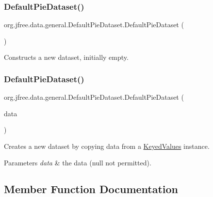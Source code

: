 \subsubsection{\texorpdfstring{Default\+Pie\+Dataset()}{DefaultPieDataset()}\hspace{0.1cm}{\footnotesize\ttfamily [1/2]}}
{\footnotesize\ttfamily org.\+jfree.\+data.\+general.\+Default\+Pie\+Dataset.\+Default\+Pie\+Dataset (\begin{DoxyParamCaption}{ }\end{DoxyParamCaption})}

Constructs a new dataset, initially empty. \mbox{\label{classorg_1_1jfree_1_1data_1_1general_1_1_default_pie_dataset_a2f48710b3db01c65393c40382d792292}} 
\subsubsection{\texorpdfstring{Default\+Pie\+Dataset()}{DefaultPieDataset()}\hspace{0.1cm}{\footnotesize\ttfamily [2/2]}}
{\footnotesize\ttfamily org.\+jfree.\+data.\+general.\+Default\+Pie\+Dataset.\+Default\+Pie\+Dataset (\begin{DoxyParamCaption}\item[{\mbox{\hyperlink{interfaceorg_1_1jfree_1_1data_1_1_keyed_values}{Keyed\+Values}}}]{data }\end{DoxyParamCaption})}

Creates a new dataset by copying data from a \mbox{\hyperlink{interfaceorg_1_1jfree_1_1data_1_1_keyed_values}{Keyed\+Values}} instance.


\begin{DoxyParams}{Parameters}
{\em data} & the data ({\ttfamily null} not permitted). \\
\hline
\end{DoxyParams}


\subsection{Member Function Documentation}
\mbox{\label{classorg_1_1jfree_1_1data_1_1general_1_1_default_pie_dataset_a1b8ef70fb8cb6d1a6f4f6e293ad6fa10}} 
